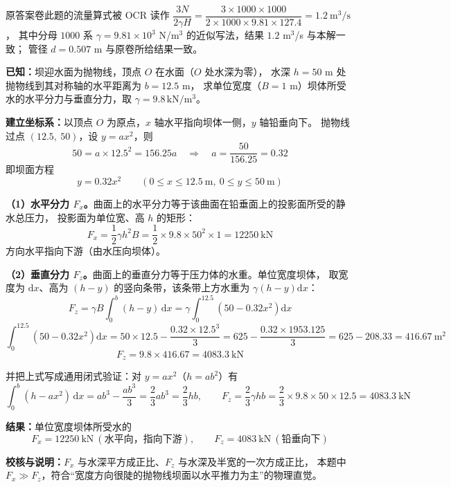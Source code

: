 \begin{tishi}
原答案卷此题的流量算式被 OCR 读作
$\dfrac{3N}{2\gamma H}=\dfrac{3\times1000\times1000}{2\times1000\times9.81\times127.4}=1.2\ \mathrm{m^3/s}$，
其中分母 $1000$ 系 $\gamma=9.81\times10^3$ N/m$^3$ 的近似写法，结果 $1.2$ m$^3$/s 与本解一致；
管径 $d=0.507$ m 与原卷所给结果一致。
\end{tishi}


\begin{jie}
\textbf{已知：}坝迎水面为抛物线，顶点 $O$ 在水面（$O$ 处水深为零），
水深 $h=50$ m 处抛物线到其对称轴的水平距离为 $b=12.5$ m，
求单位宽度（$B=1$ m）坝体所受水的水平分力与垂直分力，取 $\gamma=9.8\,\mathrm{kN/m^3}$。

\textbf{建立坐标系：}以顶点 $O$ 为原点，$x$ 轴水平指向坝体一侧，$y$ 轴铅垂向下。
抛物线过点 $(12.5,\ 50)$，设 $y=ax^2$，则
\[
50=a\times12.5^2=156.25a
\quad\Longrightarrow\quad
a=\frac{50}{156.25}=0.32
\]
即坝面方程
\[
\boxed{y=0.32x^2}\qquad(0\leqslant x\leqslant12.5\ \mathrm{m},\ 0\leqslant y\leqslant50\ \mathrm{m})
\]

\textbf{（1）水平分力 $F_x$。}曲面上的水平分力等于该曲面在铅垂面上的投影面所受的静水总压力，
投影面为单位宽、高 $h$ 的矩形：
\[
F_x=\frac{1}{2}\gamma h^2B=\frac{1}{2}\times9.8\times50^2\times1=12250\ \mathrm{kN}
\]
方向水平指向下游（由水压向坝体）。

\textbf{（2）垂直分力 $F_z$。}曲面上的垂直分力等于压力体的水重。单位宽度坝体，
取宽度为 $\mathrm{d}x$、高为 $(h-y)$ 的竖向条带，该条带上方水重为 $\gamma(h-y)\mathrm{d}x$：
\[
F_z=\gamma B\int_0^{b}(h-y)\,\mathrm{d}x
=\gamma\int_0^{12.5}\left(50-0.32x^2\right)\mathrm{d}x
\]
\[
\int_0^{12.5}\left(50-0.32x^2\right)\mathrm{d}x
=50\times12.5-\frac{0.32\times12.5^3}{3}
=625-\frac{0.32\times1953.125}{3}
=625-208.33=416.67\ \mathrm{m^2}
\]
\[
F_z=9.8\times416.67=4083.3\ \mathrm{kN}
\]

并把上式写成通用闭式验证：对 $y=ax^2$（$h=ab^2$）有
\[
\int_0^b(h-ax^2)\,\mathrm{d}x=ab^3-\frac{ab^3}{3}=\frac{2}{3}ab^3=\frac{2}{3}hb,
\qquad
F_z=\frac{2}{3}\gamma hb=\frac{2}{3}\times9.8\times50\times12.5=4083.3\ \mathrm{kN}
\]

\textbf{结果：}单位宽度坝体所受水的
\[
\boxed{F_x=12250\ \mathrm{kN}\ (\text{水平向，指向下游})},\qquad
\boxed{F_z=4083\ \mathrm{kN}\ (\text{铅垂向下})}
\]

\textbf{校核与说明：}$F_x$ 与水深平方成正比、$F_z$ 与水深及半宽的一次方成正比，
本题中 $F_x\gg F_z$，符合“宽度方向很陡的抛物线坝面以水平推力为主”的物理直觉。
\end{jie}

